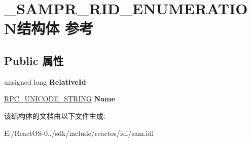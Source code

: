 \hypertarget{struct___s_a_m_p_r___r_i_d___e_n_u_m_e_r_a_t_i_o_n}{}\section{\+\_\+\+S\+A\+M\+P\+R\+\_\+\+R\+I\+D\+\_\+\+E\+N\+U\+M\+E\+R\+A\+T\+I\+O\+N结构体 参考}
\label{struct___s_a_m_p_r___r_i_d___e_n_u_m_e_r_a_t_i_o_n}
\subsection*{Public 属性}
\begin{DoxyCompactItemize}
\item 
\mbox{\label{struct___s_a_m_p_r___r_i_d___e_n_u_m_e_r_a_t_i_o_n_a0a358263e133ccb14cd3fe06ea9ac89d}} 
unsigned long {\bfseries Relative\+Id}
\item 
\mbox{\label{struct___s_a_m_p_r___r_i_d___e_n_u_m_e_r_a_t_i_o_n_a979615fc58cda2f4fd4fb26bef1b337d}} 
\hyperlink{struct___r_p_c___u_n_i_c_o_d_e___s_t_r_i_n_g}{R\+P\+C\+\_\+\+U\+N\+I\+C\+O\+D\+E\+\_\+\+S\+T\+R\+I\+NG} {\bfseries Name}
\end{DoxyCompactItemize}


该结构体的文档由以下文件生成\+:\begin{DoxyCompactItemize}
\item 
E\+:/\+React\+O\+S-\/0../sdk/include/reactos/idl/sam.\+idl\end{DoxyCompactItemize}
